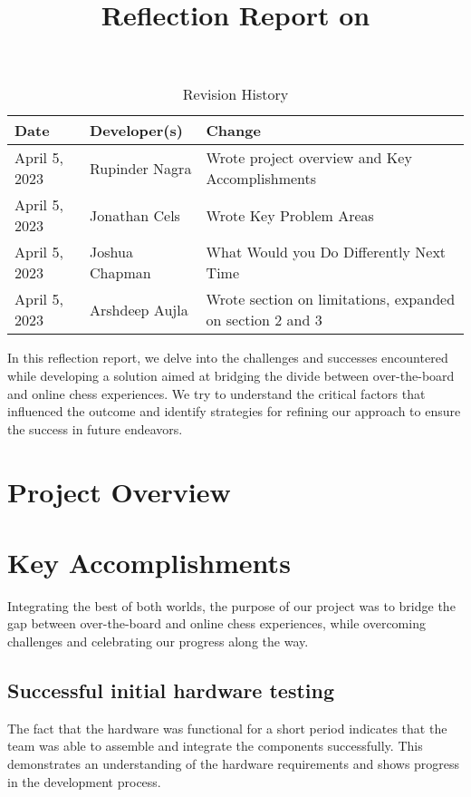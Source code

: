 \documentclass{article}
\title{Reflection Report on \progname}
\author{\authname}
\date{}
\begin{document}
\begin{table}[hp]
\caption{Revision History} \label{TblRevisionHistory}
\begin{tabularx}{\textwidth}{llX}
\toprule
\textbf{Date} & \textbf{Developer(s)} & \textbf{Change}\\
\midrule
April 5, 2023 & Rupinder Nagra & Wrote project overview and Key Accomplishments\\
April 5, 2023 & Jonathan Cels & Wrote Key Problem Areas\\
April 5, 2023 & Joshua Chapman & What Would you Do Differently Next Time\\
April 5, 2023 & Arshdeep Aujla & Wrote section on limitations, expanded on section 2 and 3\\
\bottomrule
\end{tabularx}
\end{table}

\newpage

\maketitle

In this reflection report, we delve into the challenges and successes encountered while developing a solution aimed at bridging the divide between over-the-board and online chess experiences. We try to understand the critical factors that influenced the outcome and identify strategies for refining our approach to ensure the success in future endeavors.

\section{Project Overview}
\projectoverview

\section{Key Accomplishments}

Integrating the best of both worlds, the purpose of our project was to bridge the gap between over-the-board and online chess experiences, while overcoming challenges and celebrating our progress along the way.

\subsection{Successful initial hardware testing}
The fact that the hardware was functional for a short period indicates that the team was able to assemble and integrate the components successfully. This demonstrates an understanding of the hardware requirements and shows progress in the development process.
\end{document}
